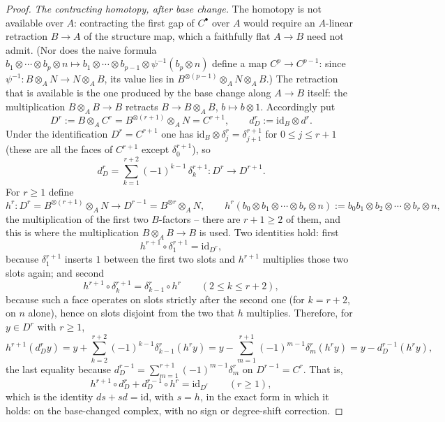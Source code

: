 \begin{proof}
\emph{The contracting homotopy, after base change.}  The homotopy is not
available over $A$: contracting the first gap of $C^\bullet$ over $A$
would require an $A$-linear retraction $B\to A$ of the structure map,
which a faithfully flat $A\to B$ need not admit.  (Nor does the naive
formula $b_1\otimes\cdots\otimes b_p\otimes n\mapsto
b_1\otimes\cdots\otimes b_{p-1}\otimes\psi^{-1}(b_p\otimes n)$ define a
map $C^p\to C^{p-1}$: since $\psi^{-1}:B\otimes_AN\to N\otimes_AB$, its
value lies in $B^{\otimes(p-1)}\otimes_AN\otimes_AB$.)  The retraction
that is available is the one produced by the base change along $A\to B$
itself: the multiplication $B\otimes_AB\to B$ retracts
$B\to B\otimes_AB$, $b\mapsto b\otimes1$.  Accordingly put
\[
D^r:=B\otimes_AC^r=B^{\otimes(r+1)}\otimes_AN=C^{r+1},
\qquad d^r_D:=\mathrm{id}_B\otimes d^r.
\]
Under the identification $D^r=C^{r+1}$ one has
$\mathrm{id}_B\otimes\delta^r_j=\delta^{r+1}_{j+1}$ for $0\le j\le r+1$
(these are all the faces of $C^{r+1}$ except $\delta^{r+1}_0$), so
\[
d^r_D=\sum_{k=1}^{r+2}(-1)^{k-1}\,\delta^{r+1}_k:D^r\longrightarrow
D^{r+1}.
\]
For $r\ge1$ define
\[
h^r:D^r=B^{\otimes(r+1)}\otimes_AN\longrightarrow
D^{r-1}=B^{\otimes r}\otimes_AN,\qquad
h^r(b_0\otimes b_1\otimes\cdots\otimes b_r\otimes n):=
b_0b_1\otimes b_2\otimes\cdots\otimes b_r\otimes n,
\]
the multiplication of the first two $B$-factors -- there are $r+1\ge2$
of them, and this is where the multiplication $B\otimes_AB\to B$ is
used.  Two identities hold: first
\[
h^{r+1}\circ\delta^{r+1}_1=\mathrm{id}_{D^r},
\]
because $\delta^{r+1}_1$ inserts $1$ between the first two slots and
$h^{r+1}$ multiplies those two slots again; and second
\[
h^{r+1}\circ\delta^{r+1}_k=\delta^r_{k-1}\circ h^r
\qquad(2\le k\le r+2),
\]
because such a face operates on slots strictly after the second one
(for $k=r+2$, on $n$ alone), hence on slots disjoint from the two that
$h$ multiplies.  Therefore, for $y\in D^r$ with $r\ge1$,
\[
h^{r+1}(d^r_Dy)=y+\sum_{k=2}^{r+2}(-1)^{k-1}\delta^r_{k-1}(h^ry)
=y-\sum_{m=1}^{r+1}(-1)^{m-1}\delta^r_m(h^ry)=y-d^{r-1}_D(h^ry),
\]
the last equality because $d^{r-1}_D=\sum_{m=1}^{r+1}(-1)^{m-1}\delta^r_m$
on $D^{r-1}=C^r$.  That is,
\[
h^{r+1}\circ d^r_D+d^{r-1}_D\circ h^r=\mathrm{id}_{D^r}
\qquad(r\ge1),
\]
which is the identity $ds+sd=\mathrm{id}$, with $s=h$, in the exact form
in which it holds: on the base-changed complex, with no sign or
degree-shift correction.


\end{proof}

